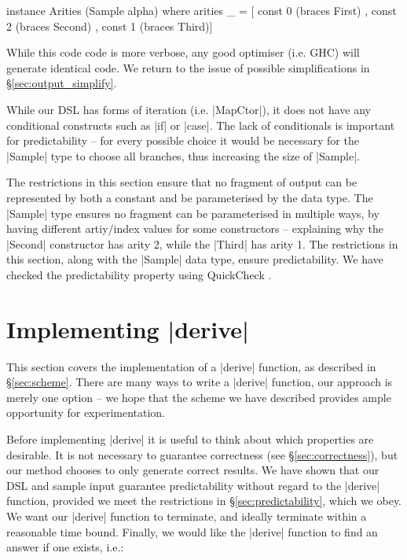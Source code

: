 \documentclass[preprint,draft]{sigplanconf}
\begin{document}
\begin{code}
instance Arities (Sample alpha) where
    arities _ =  [  const 0 (braces First)
                 ,  const 2 (braces Second)
                 ,  const 1 (braces Third)]
\end{code}

While this code code is more verbose, any good optimiser (i.e. GHC) will generate identical code. We return to the issue of possible simplifications in \S\ref{sec:output_simplify}.

While our DSL has forms of iteration (i.e. |MapCtor|), it does not have any conditional constructs such as |if| or |case|. The lack of conditionals is important for predictability -- for every possible choice it would be necessary for the |Sample| type to choose all branches, thus increasing the size of |Sample|.

The restrictions in this section ensure that no fragment of output can be represented by both a constant and be parameterised by the data type. The |Sample| type ensures no fragment can be parameterised in multiple ways, by having different artiy/index values for some constructors -- explaining why the |Second| constructor has arity 2, while the |Third| has arity 1. The restrictions in this section, along with the |Sample| data type, ensure predictability. We have checked the predictability property using QuickCheck \cite{quickcheck}.

\section{Implementing |derive|}
\label{sec:guess}

This section covers the implementation of a |derive| function, as described in \S\ref{sec:scheme}. There are many ways to write a |derive| function, our approach is merely one option -- we hope that the scheme we have described provides ample opportunity for experimentation.

Before implementing |derive| it is useful to think about which properties are desirable. It is not necessary to guarantee correctness (see \S\ref{sec:correctness}), but our method chooses to only generate correct results. We have shown that our DSL and sample input guarantee predictability without regard to the |derive| function, provided we meet the restrictions in \S\ref{sec:predictability}, which we obey. We want our |derive| function to terminate, and ideally terminate within a reasonable time bound. Finally, we would like the |derive| function to find an answer if one exists, i.e.:
\end{document}
